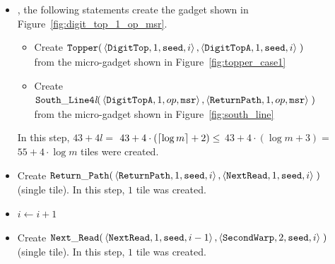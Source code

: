 \begin{itemize}
    \item {\dtop}, the following statements create the gadget shown in Figure~\ref{fig:digit_top_1_op_msr}.
    \begin{itemize}
        \item Create
        $\begin{aligned}[t]
            {\tt Topper}(&\left\langle {\tt DigitTop},  1, {\tt seed}, i \right\rangle,
                          \left\langle {\tt DigitTopA}, 1, {\tt seed}, i \right\rangle \;)
        \end{aligned}$\\from the micro-gadget shown in Figure~\ref{fig:topper_case1}
        \item Create
        $\begin{aligned}[t]
            {\tt South\_Line4\textit{l}}(&\left\langle {\tt DigitTopA},  1, \inc, {\tt msr}\right\rangle,
                                          \left\langle {\tt ReturnPath}, 1, \inc, {\tt msr}\right\rangle \;)
        \end{aligned}$\\from the micro-gadget shown in Figure~\ref{fig:south_line}
    \end{itemize}
    In this step, $43 + 4l =$
    $43 + 4 \cdot \left( \ceil*{\log m} + 2 \right) \leq$
    $43 + 4 \cdot \left( {\log m} + 3 \right) =$
    $55 + 4 \cdot {\log m}$ tiles were created.

    \item Create
    $\begin{aligned}[t]
            \returnpath(&\left\langle {\tt ReturnPath}, 1, {\tt seed}, i \right\rangle,
                         \left\langle {\tt NextRead},   1, {\tt seed}, i \right\rangle \;)
    \end{aligned}$\\ (single tile).
    In this step, $1$ tile was created.

    \item $i \gets i + 1$

    \item Create
    $\begin{aligned}[t]
            \nextread(&\left\langle {\tt NextRead},   1, {\tt seed}, i-1 \right\rangle,
                       \left\langle {\tt SecondWarp}, 2, {\tt seed}, i   \right\rangle \;)
    \end{aligned}$\\ (single tile).
    In this step, $1$ tile was created.


\end{itemize}
